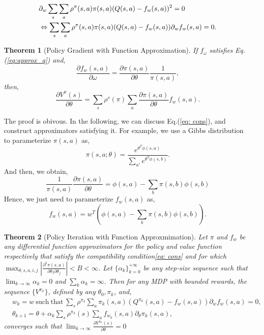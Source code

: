 \documentclass[11pt,a4paper]{article}
\newtheorem{theorem}{Theorem}[subsection]
\begin{document}
\begin{equation}
\aligned 
& \partial_w \sum_{s}\sum_{a}\rho^\pi(s,a)\pi(s,a)(Q(s,a)-f_w(s,a))^2 = 0 \\ 
\label{eq:approx_q}
& \Leftrightarrow \sum_{s}\sum_{a}\rho^\pi(s,a)\pi(s,a)(Q(s,a)-f_w(s,a))\partial_w f_w(s,a) = 0.
\endaligned
\end{equation}
\begin{theorem}[Policy Gradient with Function Approximation]
If $f_{\omega}$ satisfies Eq.(\ref{eq:approx_q}) and,
\begin{equation}
\label{eq: cons}
\frac{\partial f_w(s,a)}{\partial \omega} = \frac{\partial \pi(s,a)}{\partial \theta}\frac{1}{\pi(s,a)},
\end{equation}
then,
\begin{equation}
\frac{\partial V^{\pi}(s)}{\partial \theta} = \sum_{s}\rho^{s}(\pi)\sum_{a}\frac{\partial \pi(s,a)}{\partial \theta}f_w(s,a).
\end{equation}
\end{theorem}
The proof is obivous. In the following, we can discuss Eq.(\ref{eq: cons}), and construct approximators satisfying it. For example, we use a Gibbs distribution to parameterize $\pi(s,a)$ as,
\begin{equation}
\pi(s,a;\theta) = \frac{e^{\theta^T \phi(s,a)}}{\sum_{a'}e^{\theta^T\phi(s,b)}}.
\end{equation}
And then, we obtain,
\begin{equation}
\frac{1}{\pi(s,a)}\frac{\partial \pi(s,a)}{\partial \theta} = \phi(s,a) - \sum_{b}\pi(s,b)\phi(s,b)
\end{equation}
Hence, we just need to parameterize $f_w(s,a)$ as,
\begin{equation}
f_w(s,a) = w^T(\phi(s,a)-\sum_b \pi(s,b)\phi(s,b)).
\end{equation}

\begin{theorem}[Policy Iteration with Function Approxmimation]
Let $\pi$ and $f_w$ be any differential function approximators for the policy and value function respectively that satisfy the compatibility condition\ref{eq: cons} and for which $\max_{\theta,s,a,i,j}|\frac{\partial^2\pi(s,a)}{\partial\theta_I\partial\theta_j}|<B<\infty$. Let $\{\alpha_k\}_{k=0}^{+\infty}$ be any step-size sequence such that $\lim_{k\to\infty} \alpha_k =0$ and $\sum_k \alpha_k = \infty$. Then for any MDP with bounded rewards, the sequence $\{V^{\pi_k}\}$, defined by any $\theta_0, \pi_k$, and,
\begin{align}
& w_k = w\ \mathrm{such\ that}\ \sum_{s}\rho^{\pi_k}\sum_a\pi_k(s,a)(Q^{\pi_k}(s,a)-f_w(s,a))\partial_w f_w(s,a) = 0, \\ 
& \theta_{k+1} = \theta + \alpha_k \sum_{s}\rho^{\pi_k}(s)\sum_af_{w_k}(s,a)\partial_{\theta}\pi_k(s,a),
\end{align}
converges such that $\lim_{k\to \infty}\frac{\partial V^{\pi_k}(s)}{\partial \theta} = 0$
\end{theorem}
\end{document}
